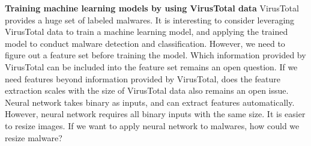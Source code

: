 {\bf Training machine learning models by using VirusTotal data}
VirusTotal provides a huge set of labeled malwares. 
It is interesting to consider leveraging VirusTotal data to train a machine learning model, and applying the trained model to conduct malware detection and classification. 
However, we need to figure out a feature set before training the model. 
Which information provided by VirusTotal can be included into the feature set remains an open question. If we need features beyond information provided by VirusTotal, does the feature extraction scales with the size of VirusTotal data also remains an open issue. 
Neural network takes binary as inputs, and can extract features automatically. 
However, neural network requires all binary inputs with the same size. It is easier to resize images. If we want to apply neural network to malwares, how could we resize malware? 
